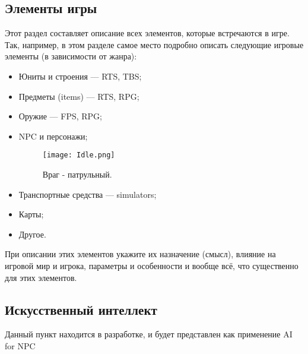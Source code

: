 \documentclass[a4paper,12pt]{article}
\begin{document}
\subsection{Элементы игры}
Этот раздел составляет описание всех элементов, которые встречаются в игре. Так, например, в этом разделе самое место подробно описать следующие игровые элементы (в зависимости от жанра):

\begin{itemize}
    \item Юниты и строения — RTS, TBS;
    \item Предметы (items) — RTS, RPG;
    \item Оружие — FPS, RPG;
    \item NPC и персонажи;
    \begin{figure}[H] 
    \centering
    \texttt{[image: Idle.png]} 
    \caption{Враг - патрульный.}
    \label{fig:player_character}
    \end{figure}
    \item Транспортные средства — simulators;
    \item Карты;
    \item Другое.
\end{itemize}

При описании этих элементов укажите их назначение (смысл), влияние на игровой мир и игрока, параметры и особенности и вообще всё, что существенно для этих элементов.

\subsection{Искусственный интеллект}
Данный пункт находится в разработке, и будет представлен как применение AI for NPC
\end{document}
